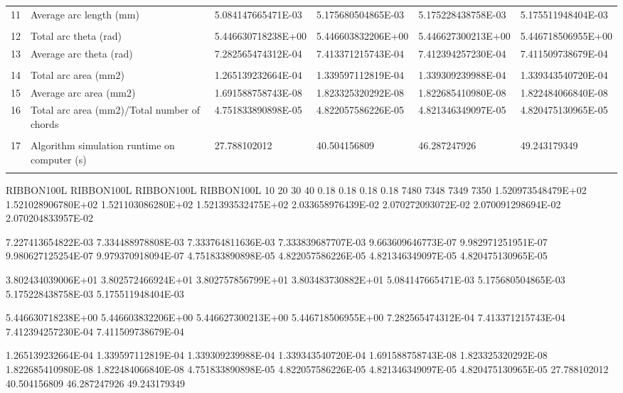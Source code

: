 \begin{tabular}{ p{0.5cm} p{8.0cm} p{4.00cm} p{4.0cm} p{4.00cm} p{4.0cm}}
11	& Average arc length (mm)	                           & 5.084147665471E-03	& 5.175680504865E-03   & 5.175228438758E-03	& 5.175511948404E-03 \\
	&                                                      &                    &                      &                    & \\
12	& Total arc theta (rad)	                               & 5.446630718238E+00	& 5.446603832206E+00   & 5.446627300213E+00	& 5.446718506955E+00 \\
13	& Average arc theta (rad)	                           & 7.282565474312E-04	& 7.413371215743E-04   & 7.412394257230E-04	& 7.411509738679E-04 \\
	&                                                      &                    &                      &                    & \\
14	& Total arc area (mm2)	                               & 1.265139232664E-04	& 1.339597112819E-04   & 1.339309239988E-04	& 1.339343540720E-04 \\
15	& Average arc area (mm2)	                           & 1.691588758743E-08	& 1.823325320292E-08   & 1.822685410980E-08	& 1.822484066840E-08 \\
16	& Total arc area (mm2)/Total number of chords	       & 4.751833890898E-05	& 4.822057586226E-05   & 4.821346349097E-05	& 4.820475130965E-05 \\
	&                                                      &                    &                      &                    & \\
17	& Algorithm simulation runtime on computer (s)         & 27.788102012	    & 40.504156809	       & 46.287247926	    & 49.243179349\\
	&                                                      &                    &                      &                    & 
\end{tabular}


RIBBON100L	RIBBON100L	RIBBON100L	RIBBON100L
10	20	30	40
0.18	0.18	0.18	0.18
7480	7348	7349	7350
1.520973548479E+02	1.521028906780E+02	1.521103086280E+02	1.521393532475E+02
2.033658976439E-02	2.070272093072E-02	2.070091298694E-02	2.070204833957E-02

7.227413654822E-03	7.334488978808E-03	7.333764811636E-03	7.333839687707E-03
9.663609646773E-07	9.982971251951E-07	9.980627125254E-07	9.979370918094E-07
4.751833890898E-05	4.822057586226E-05	4.821346349097E-05	4.820475130965E-05

3.802434039006E+01	3.802572466924E+01	3.802757856799E+01	3.803483730882E+01
5.084147665471E-03	5.175680504865E-03	5.175228438758E-03	5.175511948404E-03

5.446630718238E+00	5.446603832206E+00	5.446627300213E+00	5.446718506955E+00
7.282565474312E-04	7.413371215743E-04	7.412394257230E-04	7.411509738679E-04

1.265139232664E-04	1.339597112819E-04	1.339309239988E-04	1.339343540720E-04
1.691588758743E-08	1.823325320292E-08	1.822685410980E-08	1.822484066840E-08
4.751833890898E-05	4.822057586226E-05	4.821346349097E-05	4.820475130965E-05
27.788102012	40.504156809	46.287247926	49.243179349

